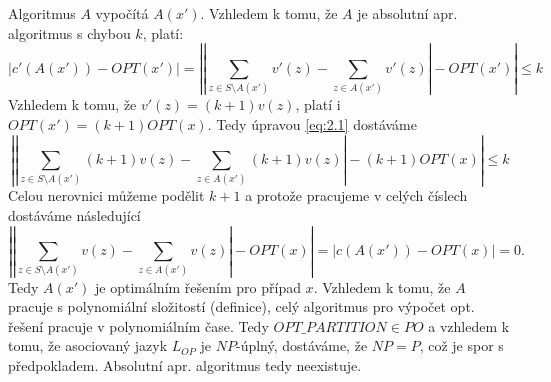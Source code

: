 \documentclass[a4paper,12pt]{article}
\begin{document}
\begin{enumerate}[label=\textbf{\arabic*}.]
  Algoritmus $A$ vypočítá $A(x')$. Vzhledem k tomu, že $A$ je absolutní apr. algoritmus s chybou $k$, platí:
  \begin{equation}\label{eq:2.1}
    |c'(A(x')) - OPT(x')| = \left|\left|\sum_{z\in S\setminus A(x')}v'(z) - \sum_{z\in A(x')}v'(z)\right| - OPT(x')\right| \leq k
  \end{equation}
  Vzhledem k tomu, že $v'(z) = (k+1)v(z)$, platí i $OPT(x') = (k+1)OPT(x)$. Tedy úpravou \eqref{eq:2.1} dostáváme
  \begin{equation}\label{eq:2.2}
    \left|\left|\sum_{z\in S\setminus A(x')}(k+1)v(z) - \sum_{z\in A(x')}(k+1)v(z)\right| - (k+1)OPT(x)\right| \leq k
  \end{equation}
  Celou nerovnici můžeme podělit $k+1$ a protože pracujeme v celých číslech dostáváme následující
  $$
    \left|\left|\sum_{z\in S\setminus A(x')}v(z) - \sum_{z\in A(x')}v(z)\right| - OPT(x)\right| = |c(A(x')) - OPT(x)| = 0.
  $$
  Tedy $A(x')$ je optimálním řešením pro případ $x$. Vzhledem k tomu, že $A$ pracuje s polynomiální složitostí (definice), 
  celý algoritmus pro výpočet opt. řešení pracuje v polynomiálním čase. Tedy $OPT\_PARTITION\in PO$ a vzhledem k tomu,
  že asociovaný jazyk $L_{OP}$ je $NP$-úplný, dostáváme, že $NP = P$, což je spor s předpokladem. Absolutní apr. algoritmus 
  tedy neexistuje.
 
\end{enumerate}
\end{document}
